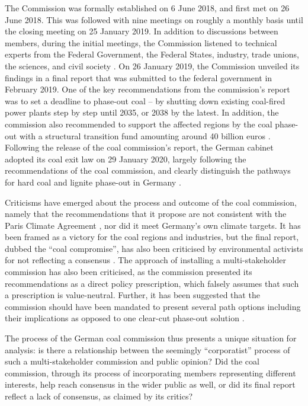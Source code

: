 \documentclass[12pt,onecolumn,twoside]{layout}
\begin{document}
The Commission was formally established on 6 June 2018, and first met on 26 June 2018. This was followed with nine meetings on roughly a monthly basis until the closing meeting on 25 January 2019. In addition to discussions between members, during the initial meetings, the Commission listened to technical experts from the Federal Government, the Federal States, industry, trade unions, the sciences, and civil society \cite{Wehrmann2018}. On 26 January 2019, the Commission unveiled its findings in a final report that was submitted to the federal government in February 2019. One of the key recommendations from the commission's report was to set a deadline to phase-out coal -- by shutting down existing coal-fired power plants step by step until 2035, or 2038 by the latest. In addition, the commission also recommended to support the affected regions by the coal phase-out with a structural transition fund amounting around 40 billion euros \cite{Egenter2019}. Following the release of the coal commission's report, the German cabinet adopted its coal exit law on 29 January 2020, largely following the recommendations of the coal commission, and clearly distinguish the pathways for hard coal and lignite phase-out in Germany \cite{Wettengel2020}. 

Criticisms have emerged about the process and outcome of the coal commission, namely that the recommendations that it propose are not consistent with the Paris Climate Agreement \cite{klimareporter2019a}, nor did it meet Germany's own climate targets. It has been framed as a victory for the coal regions and industries, but the final report, dubbed the ``coal compromise'', has also been criticised by environmental activists for not reflecting a consensus \cite{klimareporter2019,endegelaende2019}. The approach of installing a multi-stakeholder commission has also been criticised, as the commission presented its recommendations as a direct policy prescription, which falsely assumes that such a prescription is value-neutral. Further, it has been suggested that the commission should have been mandated to present several path options including their implications as opposed to one clear-cut phase-out solution \cite{Kowarsch2019}.     

The process of the German coal commission thus presents a unique situation for analysis: is there a relationship between the seemingly ``corporatist'' process of such a multi-stakeholder commission and public opinion? Did the coal commission, through its process of incorporating members representing different interests, help reach consensus in the wider public as well, or did its final report reflect a lack of consensus, as claimed by its critics?
\end{document}
